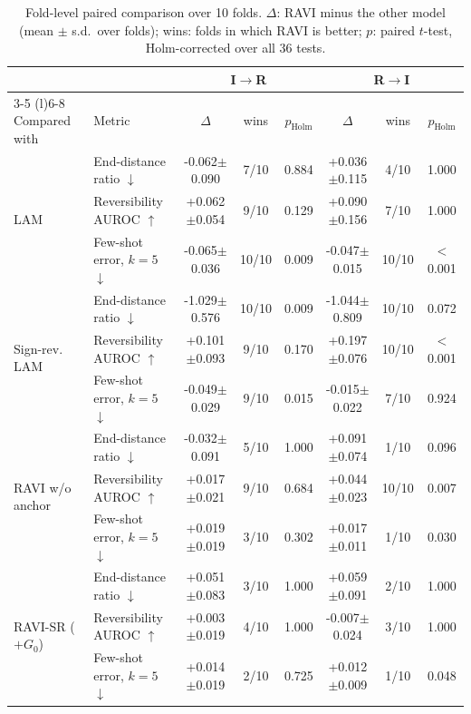 \documentclass{jcse}
\newcommand{\method}{RAVI}
\begin{document}
\begin{table}
	\centering
	\caption{Fold-level paired comparison over 10 folds. $\Delta$: {\method} minus the other model (mean $\pm$ s.d.\ over folds); wins: folds in which {\method} is better; $p$: paired $t$-test, Holm-corrected over all 36 tests.}
	\label{t:paired}
	\footnotesize
	\setlength{\tabcolsep}{3.5pt}
	\begin{tabular}{llcccccc}
		\toprule
		& & \multicolumn{3}{c}{I$\to$R} & \multicolumn{3}{c}{R$\to$I} \\
		\cmidrule(r){3-5} \cmidrule(l){6-8}
		Compared with & Metric & $\Delta$ & wins & $p_{\mathrm{Holm}}$ & $\Delta$ & wins & $p_{\mathrm{Holm}}$ \\
		\midrule
		\multirow{3}{*}{LAM} & End-distance ratio $\downarrow$ & -0.062$\pm$0.090 & 7/10 & 0.884 & +0.036$\pm$0.115 & 4/10 & 1.000 \\
		 & Reversibility AUROC $\uparrow$ & +0.062$\pm$0.054 & 9/10 & 0.129 & +0.090$\pm$0.156 & 7/10 & 1.000 \\
		 & Few-shot error, $k=5$ $\downarrow$ & -0.065$\pm$0.036 & 10/10 & 0.009 & -0.047$\pm$0.015 & 10/10 & $<$0.001 \\
		\midrule
		\multirow{3}{*}{Sign-rev. LAM} & End-distance ratio $\downarrow$ & -1.029$\pm$0.576 & 10/10 & 0.009 & -1.044$\pm$0.809 & 10/10 & 0.072 \\
		 & Reversibility AUROC $\uparrow$ & +0.101$\pm$0.093 & 9/10 & 0.170 & +0.197$\pm$0.076 & 10/10 & $<$0.001 \\
		 & Few-shot error, $k=5$ $\downarrow$ & -0.049$\pm$0.029 & 9/10 & 0.015 & -0.015$\pm$0.022 & 7/10 & 0.924 \\
		\midrule
		\multirow{3}{*}{{\method} w/o anchor} & End-distance ratio $\downarrow$ & -0.032$\pm$0.091 & 5/10 & 1.000 & +0.091$\pm$0.074 & 1/10 & 0.096 \\
		 & Reversibility AUROC $\uparrow$ & +0.017$\pm$0.021 & 9/10 & 0.684 & +0.044$\pm$0.023 & 10/10 & 0.007 \\
		 & Few-shot error, $k=5$ $\downarrow$ & +0.019$\pm$0.019 & 3/10 & 0.302 & +0.017$\pm$0.011 & 1/10 & 0.030 \\
		\midrule
		\multirow{3}{*}{{\method}-SR ($+G_0$)} & End-distance ratio $\downarrow$ & +0.051$\pm$0.083 & 3/10 & 1.000 & +0.059$\pm$0.091 & 2/10 & 1.000 \\
		 & Reversibility AUROC $\uparrow$ & +0.003$\pm$0.019 & 4/10 & 1.000 & -0.007$\pm$0.024 & 3/10 & 1.000 \\
		 & Few-shot error, $k=5$ $\downarrow$ & +0.014$\pm$0.019 & 2/10 & 0.725 & +0.012$\pm$0.009 & 1/10 & 0.048 \\

\end{tabular}
\end{table}
\end{document}
